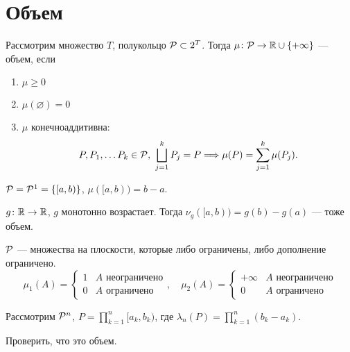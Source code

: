 \section{Объем}
\begin{defn}[Объем]
    Рассмотрим множество $ T$, полукольцо $ \P \subset 2^{T}$. Тогда $ \mu\colon \P \to \R \cup \{+\infty\}$ --- {\sf объем}, если
\begin{enumerate}[label=(\roman*),noitemsep]
    \item  $ \mu \ge 0$
	\item $ \mu(\varnothing) = 0$

	\item $ \mu$ конечноаддитивна:
		\[
			P, P_1, \ldots P_k \in \P, ~ \bigsqcup_{j=1}^{k}P_j = P \Longrightarrow \mu(P) = \sum_{j=1}^{k} \mu(P_j)
		.\] 
\end{enumerate} 
\end{defn}
\begin{ex}
	$ \P = \P^{1} = \{[a, b)\}$, $ \mu([a, b)) = b - a$.
\end{ex}
\begin{ex}
	$ g\colon \R \to \R$, $ g$ монотонно возрастает. Тогда  $ \nu_{g} ([a, b)) = g(b)-g(a)$ --- тоже объем.
\end{ex}
\begin{ex}
    $ \P$ --- множества на плоскости, которые либо ограничены, либо дополнение ограничено.
	\[
		\mu_1 (A) = 
		\begin{cases}
			1 & A  \text{ неограничено} \\
			0 & A  \text{ ограничено}
		\end{cases}
		, \quad
		\mu_2 (A) = 
		\begin{cases}
			+\infty & A  \text{ неограничено} \\
			0 & A  \text{ ограничено}
		\end{cases}
	\] 
\end{ex}
\begin{ex}
	Рассмотрим $ \P^{n}$, $ P = \prod\limits_{k=1}^{n} [a_k , b_k)$, где $ \lambda _{n}(P) = \prod_{k=1}^{n}(b_k - a_k)$.
	\begin{prac}
	    Проверить, что это объем.
	\end{prac}
\end{ex}

